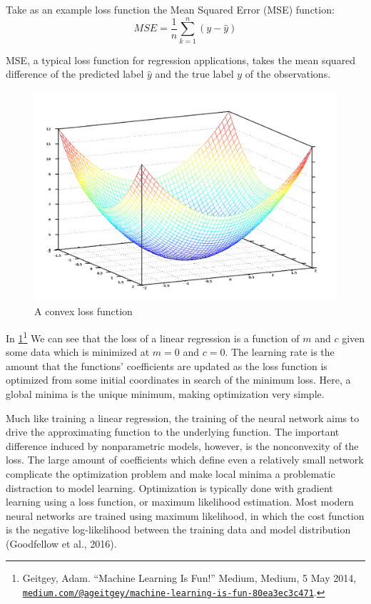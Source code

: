 \documentclass[12pt,twoside]{reedthesis}
\begin{document}
Take as an example loss function the Mean Squared Error (MSE) function:
\[
MSE = \frac{1}{n} \sum_{k=1}^n  (y - \hat y)
\]

MSE, a typical loss function for regression applications, takes the mean
squared difference of the predicted label \(\hat y\) and the true label
\(y\) of the observations.
\begin{figure}
\includegraphics[width=0.95\linewidth]{figure/optimize} \caption{A convex loss function}\label{fig:optimize}
\end{figure}
In \ref{fig:optimize}\footnote{Geitgey, Adam. ``Machine Learning Is
  Fun!'' Medium, Medium, 5 May 2014,
  \href{mailto:medium.com/@ageitgey/machine-learning-is-fun-80ea3ec3c471}{\nolinkurl{medium.com/@ageitgey/machine-learning-is-fun-80ea3ec3c471}}.}
We can see that the loss of a linear regression is a function of \(m\)
and \(c\) given some data which is minimized at \(m = 0\) and \(c = 0\).
The learning rate is the amount that the functions' coefficients are
updated as the loss function is optimized from some initial coordinates
in search of the minimum loss. Here, a global minima is the unique
minimum, making optimization very simple.

Much like training a linear regression, the training of the neural
network aims to drive the approximating function to the underlying
function. The important difference induced by nonparametric models,
however, is the nonconvexity of the loss. The large amount of
coefficients which define even a relatively small network complicate the
optimization problem and make local minima a problematic distraction to
model learning. Optimization is typically done with gradient learning
using a loss function, or maximum likelihood estimation. Most modern
neural networks are trained using maximum likelihood, in which the cost
function is the negative log-likelihood between the training data and
model distribution (Goodfellow et al., 2016).
\end{document}
